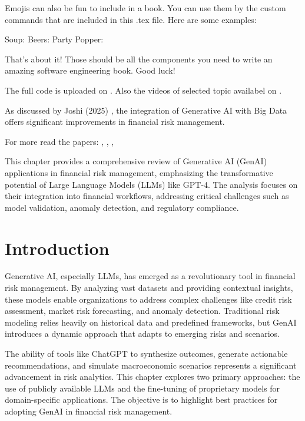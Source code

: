 \documentclass[a4paper,headinclude=on,footinclude=on,12pt,oneside]{scrbook}
\begin{document}

Emojis can also be fun to include in a book. You can use them by the custom commands that are included in this .tex file. Here are some examples:

Soup: \soup
Beers: \beers
Party Popper: \partypopper

That's about it! Those should be all the components you need to write an amazing software engineering book. Good luck!

The full code is uploaded on \cite{JoshiGit2025}.
Also the videos of selected topic availabel on \cite{JoshiYouTube2025}.

As discussed by Joshi (2025) \cite{JoshiIJFMR2025}, the integration of Generative AI with Big Data offers significant improvements in financial risk management.

For more read the papers: \cite{JoshiCSEIT2025}, \cite{JoshiIJFMR2025}, \cite{JoshiIJFMR2025}, \cite{JoshiIJIREM2025}


This chapter provides a comprehensive review of Generative AI (GenAI) applications in financial risk management, emphasizing the transformative potential of Large Language Models (LLMs) like GPT-4. The analysis focuses on their integration into financial workflows, addressing critical challenges such as model validation, anomaly detection, and regulatory compliance. 

\section{Introduction}

Generative AI, especially LLMs, has emerged as a revolutionary tool in financial risk management. By analyzing vast datasets and providing contextual insights, these models enable organizations to address complex challenges like credit risk assessment, market risk forecasting, and anomaly detection. Traditional risk modeling relies heavily on historical data and predefined frameworks, but GenAI introduces a dynamic approach that adapts to emerging risks and scenarios.

The ability of tools like ChatGPT to synthesize outcomes, generate actionable recommendations, and simulate macroeconomic scenarios represents a significant advancement in risk analytics. This chapter explores two primary approaches: the use of publicly available LLMs and the fine-tuning of proprietary models for domain-specific applications. The objective is to highlight best practices for adopting GenAI in financial risk management.
\end{document}

